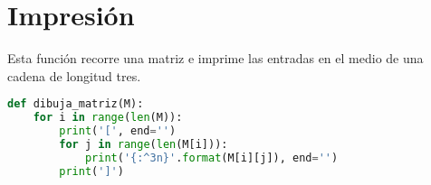 \section{Impresión}
Esta función  recorre una matriz e imprime las entradas en el medio de una cadena de longitud tres.
\begin{lstlisting}[language=python, caption=Función dibuja\_matriz()]
def dibuja_matriz(M):
    for i in range(len(M)):
        print('[', end='')
        for j in range(len(M[i])):
            print('{:^3n}'.format(M[i][j]), end='')
        print(']')
\end{lstlisting}